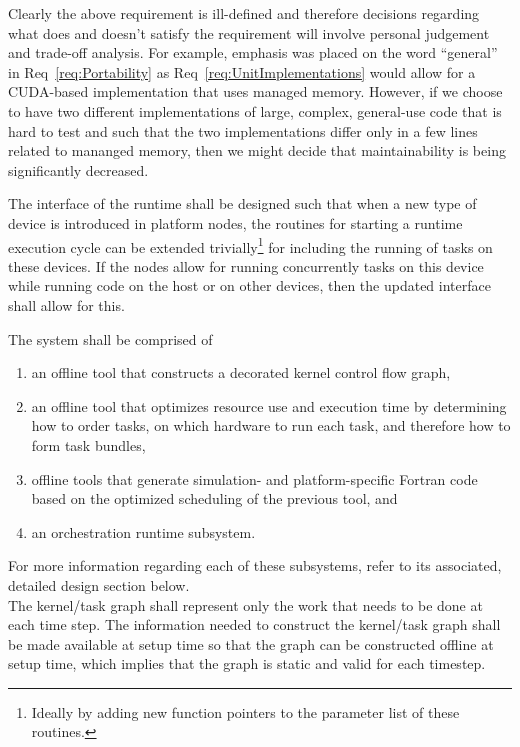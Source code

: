 \documentclass{article}
\begin{document}
Clearly the above requirement is ill-defined and therefore decisions regarding
what does and doesn't satisfy the requirement will involve personal judgement
and trade-off analysis.  For example, emphasis was placed on the word
``general'' in Req~\ref{req:Portability} as Req~\ref{req:UnitImplementations}
would allow for a CUDA-based implementation that uses managed memory.  However,
if we choose to have two different implementations of large, complex,
general-use code that is hard to test and such that the two implementations differ
only in a few lines related to mananged memory, then we might decide that
maintainability is being significantly decreased.

\begin{req}
The interface of the runtime shall be designed such  that when a new type of
device is introduced in platform nodes, the routines for starting a runtime
execution cycle can be extended trivially\footnote{Ideally by adding new function
pointers to the parameter list of these routines.} for including the running of
tasks on these devices.  If the nodes allow for running concurrently tasks on
this device while running code on the host or on other devices, then the updated
interface shall allow for this.
\end{req}

\begin{req}
The system shall be comprised of
\begin{enumerate}
\item{an offline tool that constructs a decorated kernel control flow graph,}
\item{an offline tool that optimizes resource use and execution time by
determining how to order tasks, on which hardware to run each task, and
therefore how to form task bundles,}
\item{offline tools that generate simulation- and platform-specific Fortran code
based on the optimized scheduling of the previous tool, and}
\item{an orchestration runtime subsystem.}
\end{enumerate}
\end{req}
For more information regarding each of these subsystems, refer to its
associated, detailed design section below.\\

The kernel/task graph shall represent only the work that needs to be done at
each time step.  The information needed to construct the kernel/task graph shall
be made available at setup time so that the graph can be constructed offline at
setup time, which implies that the graph is static and valid for each
timestep.\\
\end{document}
